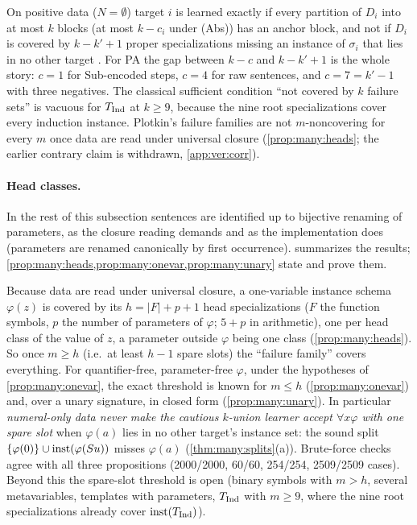 On positive data ($N=\emptyset$) target $i$ is learned exactly if every partition of $D_i$ into at most $k$ blocks (at most
$k-c_i$ under (Abs)) has an anchor block, and not if $D_i$ is covered by $k-k'+1$ proper specializations missing an
instance of $\sigma_i$ that lies in no other target . For PA the gap between $k-c$ and $k-k'+1$ is
the whole story: $c=1$ for Sub-encoded steps, $c=4$ for raw sentences, and $c=7=k'-1$ with three negatives. The classical
sufficient condition ``not covered by $k$ failure sets'' is vacuous for $T_{\mathrm{Ind}}$ at $k\ge9$, because the nine root
specializations cover every induction instance. Plotkin's failure families are not $m$-noncovering for every $m$ once data
are read under universal closure (\cref{prop:many:heads}; the earlier contrary claim is withdrawn, \cref{app:ver:corr}).

\paragraph{Head classes.} In the rest of this subsection sentences are identified up to bijective renaming of parameters,
as the closure reading demands and as the implementation does (parameters are renamed canonically by first occurrence).
 summarizes the results; \cref{prop:many:heads,prop:many:onevar,prop:many:unary} state and prove them.

\begin{remark}\label{rem:many:numerals}
Because data are read under universal closure, a one-variable instance schema $\varphi(z)$ is covered by its
$h=|F|+p+1$ head specializations ($F$ the function symbols, $p$ the number of parameters of $\varphi$; $5+p$ in
arithmetic), one per head class of the value of $z$, a parameter outside $\varphi$ being one class
(\cref{prop:many:heads}). So once $m\ge h$ (i.e.\ at least $h-1$ spare slots) the ``failure family'' covers everything.
For quantifier-free, parameter-free $\varphi$, under the hypotheses of \cref{prop:many:onevar}, the exact threshold is known
for $m\le h$ (\cref{prop:many:onevar}) and, over a unary signature, in closed form (\cref{prop:many:unary}). In particular
\emph{numeral-only data never make the cautious $k$-union learner accept $\forall x\varphi$ with one spare slot} when
$\varphi(a)$ lies in no other target's instance set: the sound split $\{\varphi(0)\}\cup\mathrm{inst}(\varphi(Su))$ misses
$\varphi(a)$ (\cref{thm:many:splits}(a)). Brute-force checks agree with all three propositions (2000/2000, 60/60, 254/254,
2509/2509 cases). Beyond this the spare-slot threshold is open (binary symbols with $m>h$, several metavariables,
templates with parameters, $T_{\mathrm{Ind}}$ with $m\ge9$, where the nine root specializations already cover $\mathrm{inst}(T_{\mathrm{Ind}})$).
\end{remark}

